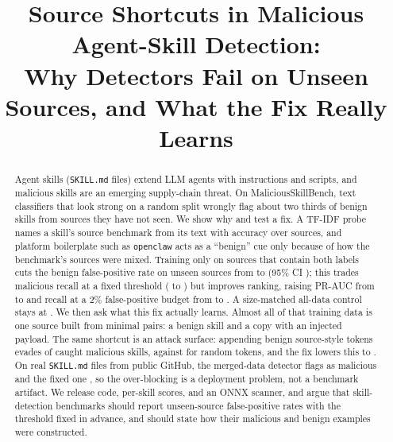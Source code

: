 \documentclass[conference]{IEEEtran}
\begin{document}
\title{Source Shortcuts in Malicious Agent-Skill Detection:\\
Why Detectors Fail on Unseen Sources, and What the Fix Really Learns}

\author{
}

\maketitle

\begin{abstract}
Agent skills (\texttt{SKILL.md} files) extend LLM agents with instructions and scripts, and malicious skills are an
emerging supply-chain threat. On MaliciousSkillBench, text classifiers that look strong on a random split
wrongly flag about two thirds of benign skills from sources they have not seen. We show why and test a fix.
A TF-IDF probe names a skill's source benchmark from its text with \ProbeAcc{} accuracy over
\ProbeSources{} sources, and platform boilerplate such as \texttt{openclaw} acts as a ``benign'' cue only
because of how the benchmark's sources were mixed. Training only on sources that contain both labels cuts the
benign false-positive rate on unseen sources from \FprAll{} to \FprMixed{} (95\% CI \FprMixedCI{}); this trades
malicious recall at a fixed threshold (\RecallAll{} to \RecallMixed{}) but improves ranking, raising PR-AUC
from \PrAll{} to \PrMixed{} and recall at a 2\% false-positive budget from \RecallAtTwoAll{} to \RecallAtTwoMixed{}.
A size-matched all-data control stays at \FprSizeMatched{}.
We then ask what this fix actually learns. Almost all of that training data is one source built from
minimal pairs: a benign skill and a copy with an injected payload. \MechanismSentence{}
\TransformerSentence{} The same shortcut is an attack surface: appending \EvasionK{} benign
source-style tokens evades \EvasionAsrAll{} of caught malicious skills, against \EvasionControlAll{}
for random tokens, and the fix lowers this to \EvasionAsrMixed{}.
On \WildN{} real \texttt{SKILL.md} files from public GitHub, the merged-data detector flags
\WildFlaggedAll{} as malicious and the fixed one \WildFlaggedMixed{}, so the over-blocking is a
deployment problem, not a benchmark artifact.
We release code, per-skill scores, and an ONNX scanner, and argue that
skill-detection benchmarks should report unseen-source false-positive rates with the threshold fixed in
advance, and should state how their malicious and benign examples were constructed.
\end{abstract}
\end{document}

